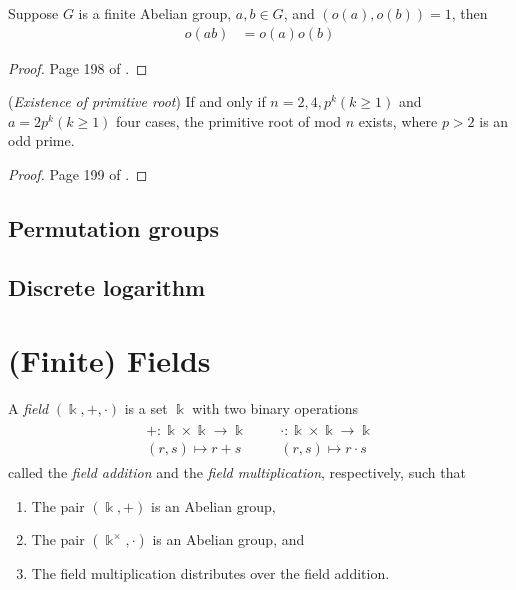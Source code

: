 \documentclass[a4paper, 12pt]{book} %
\begin{document}
\begin{proposition}
    Suppose $G$ is a finite Abelian group, $a,b \in G$, and $(o(a),o(b))= 1$, then
    \begin{align}
        o(ab) &= o(a) o(b)
    \end{align}
\end{proposition}
\begin{proof}
    Page 198 of \cite{zheng2022modern}.
\end{proof}


\begin{theorem}
    (\emph{Existence of primitive root}) If and only if $n= 2, 4, p^k(k \geq 1)$ and $a = 2 p^k(k \geq 1)$ four cases, the primitive root of mod $n$ exists, where $p > 2$ is an odd prime.
\end{theorem}
\begin{proof}
    Page 199 of \cite{zheng2022modern}.
\end{proof}

\section{Permutation groups}

\section{Discrete logarithm}


\chapter{(Finite) Fields}

\begin{definition}
    A \emph{field} $(\Bbbk, +, \cdot)$ is a set $\Bbbk$ with two binary operations
    \begin{align}
        \begin{array}{cccc}
        +: \Bbbk \times \Bbbk \longrightarrow \Bbbk & & &\cdot: \Bbbk \times \Bbbk \rightarrow \Bbbk  \\
         (r, s) \mapsto r+s & & & (r,s) \mapsto r\cdot s 
    \end{array}
    \end{align}
    called the \emph{field addition} and the \emph{field multiplication}, respectively, such that 
    \begin{enumerate}
        \item The pair $(\Bbbk, +)$ is an Abelian group, 
        \item The pair $(\Bbbk^\times, \cdot)$ is an Abelian group, and
        \item The field multiplication distributes over the field addition.
    \end{enumerate}
\end{definition}
\end{document}
